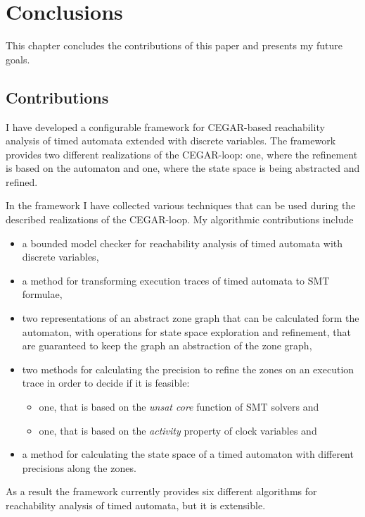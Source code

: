 \chapter{Conclusions}

This chapter concludes the contributions of this paper and presents my future goals.

\section{Contributions}

I have developed a configurable framework for CEGAR-based reachability analysis of timed automata extended with discrete variables. The framework provides two different realizations of the CEGAR-loop: one, where the refinement is based on the automaton and one, where the state space is being abstracted and refined.

In the framework I have collected various techniques that can be used during the described realizations of the CEGAR-loop. My algorithmic contributions include
\begin{itemize}
	\item a bounded model checker for reachability analysis of timed automata with discrete variables,
	\item a method for transforming execution traces of timed automata to SMT formulae, %
	\item two representations of an abstract zone graph that can be calculated form the automaton, with operations for state space exploration and refinement, that are guaranteed to keep the graph an abstraction of the zone graph,
	\item two methods for calculating the precision to refine the zones on an execution trace in order to decide if it is feasible:
	\begin{itemize}
		\item one, that is based on the \emph{unsat core} function of SMT solvers and
		\item one, that is based on the \emph{activity} property of clock variables and
	\end{itemize}
	\item a method for calculating the state space of a timed automaton with different precisions along the zones.
\end{itemize}

As a result the framework currently provides six different algorithms for reachability analysis of timed automata, but it is extensible.

